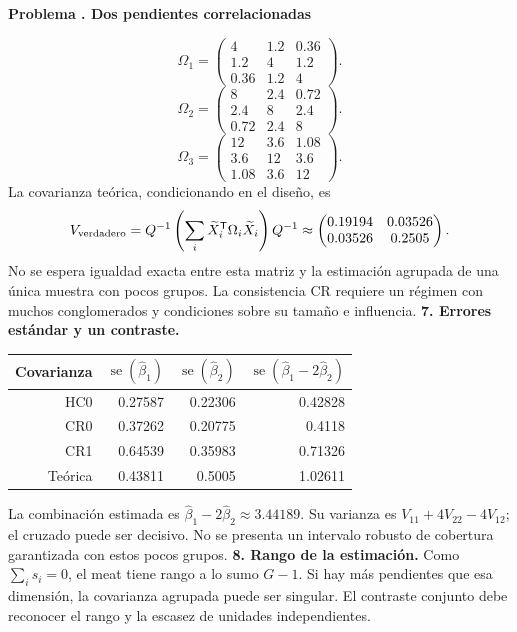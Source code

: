 \documentclass[11pt,a4paper]{article}
\newcommand{\T}{^{\mathsf T}}
\theoremstyle{definition}
\newcounter{problema}
\newenvironment{resuelto}[1]{\refstepcounter{problema}\par\medskip\Needspace{6\baselineskip}\textbf{Problema \theproblema. #1}\par}{\par\medskip}
\DeclareMathOperator{\se}{se}
\begin{document}
\begin{resuelto}{Dos pendientes correlacionadas}
\[
\Omega_{1}=\begin{pmatrix}
4&1.2&0.36\\1.2&4&1.2\\0.36&1.2&4
\end{pmatrix}.
\]
\[
\Omega_{2}=\begin{pmatrix}
8&2.4&0.72\\2.4&8&2.4\\0.72&2.4&8
\end{pmatrix}.
\]
\[
\Omega_{3}=\begin{pmatrix}
12&3.6&1.08\\3.6&12&3.6\\1.08&3.6&12
\end{pmatrix}.
\]
La covarianza teórica, condicionando en el diseño, es
\[
V_{\rm verdadero}=Q^{-1}\left(\sum_i\widetilde X_i\T\Omega_i\widetilde X_i\right)Q^{-1}\approx\begin{pmatrix}
0.19194&0.03526\\0.03526&0.2505
\end{pmatrix}.
\]
No se espera igualdad exacta entre esta matriz y la estimación agrupada de una única muestra con pocos grupos. La consistencia CR requiere un régimen con muchos conglomerados y condiciones sobre su tamaño e influencia.
\textbf{7. Errores estándar y un contraste.}

\begin{center}\small
\begin{tabular}{rrrr}
\toprule
Covarianza&$\se(\widehat\beta_1)$&$\se(\widehat\beta_2)$&$\se(\widehat\beta_1-2\widehat\beta_2)$\\
\midrule
HC0&0.27587&0.22306&0.42828\\
CR0&0.37262&0.20775&0.4118\\
CR1&0.64539&0.35983&0.71326\\
Teórica&0.43811&0.5005&1.02611\\
\bottomrule
\end{tabular}
\end{center}
La combinación estimada es $\widehat\beta_1-2\widehat\beta_2\approx3.44189$. Su varianza es $V_{11}+4V_{22}-4V_{12}$; el cruzado puede ser decisivo. No se presenta un intervalo robusto de cobertura garantizada con estos pocos grupos.
\textbf{8. Rango de la estimación.} Como $\sum_i s_i=0$, el meat tiene rango a lo sumo $G-1$. Si hay más pendientes que esa dimensión, la covarianza agrupada puede ser singular. El contraste conjunto debe reconocer el rango y la escasez de unidades independientes.
\end{resuelto}
\end{document}
